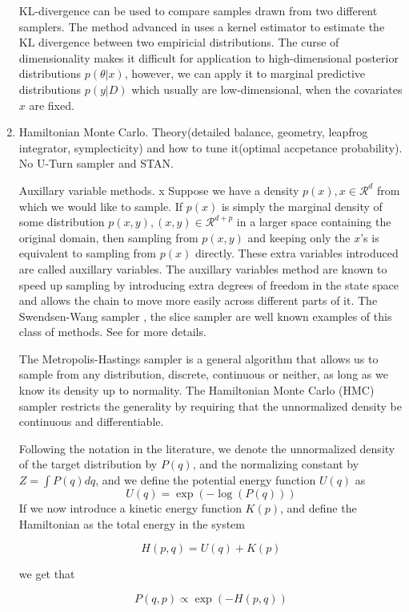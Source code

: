 \documentclass{book}
\begin{document}
\begin{enumerate}
KL-divergence can be used to compare samples drawn from two different samplers.
The method advanced in \cite{boltz2007knn,boltz2007high} uses a kernel estimator to estimate the KL divergence between two empiricial distributions. The curse of dimensionality makes it difficult for application to high-dimensional posterior distributions $p(\theta|x)$, however, we can apply it to marginal predictive distributions $p(y|D)$ which usually are low-dimensional, when the covariates $x$ are fixed.

\item Hamiltonian Monte Carlo. Theory(detailed balance, geometry, leapfrog integrator, symplecticity) and how to tune it(optimal accpetance probability). No U-Turn sampler and STAN. 

Auxillary variable methods. 
x
Suppose we have a density $p(x),x \in \mathcal{R}^d$ from which we would like to sample. If $p(x)$ is simply the marginal density of some distribution $p(x,y), (x,y) \in \mathcal{R}^{d+p}$ in a larger space containing the original domain, then sampling from $p(x,y)$ and keeping only the $x$'s is equivalent to sampling from $p(x)$ directly. These extra variables introduced are called auxillary variables. The auxillary variables method are known to speed up sampling by introducing extra degrees of freedom in the state space and allows the chain to move more easily across different parts of it. The Swendsen-Wang sampler \cite{wang1990cluster}, the slice sampler\cite{wang1990cluster} are well known examples of this class of methods. See \cite{liang2011advanced,liu2008monte} for more details.

The Metropolis-Hastings sampler is a general algorithm that allows us to sample from any distribution, discrete, continuous or neither, as long as we know its density up to normality. The Hamiltonian Monte Carlo (HMC) sampler restricts the generality by requiring that the unnormalized density be continuous and differentiable. 

Following the notation in the literature, we denote the unnormalized density of the target distribution by $P(q)$, and the normalizing constant by $Z = \int P(q)dq $, and we define the potential energy function $U(q)$ as 
\[ U(q) =  \exp(-\log(P(q))) \]
If we now introduce a kinetic energy function $K(p)$, and define
the Hamiltonian as the total energy in the system 

\[ H(p,q) = U(q) + K(p) \]

we get that 

\[P(q,p) \propto  \exp(-H(p,q)) \]


\end{enumerate}
\end{document}
